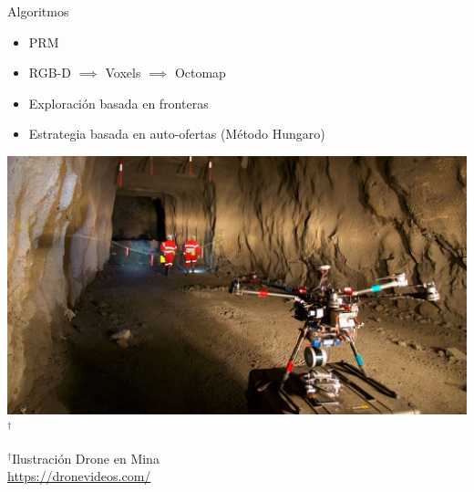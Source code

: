 \documentclass[
  24pt, %
  aspectratio=169, %
]{beamer}
\begin{document}
\begin{frame}{Algoritmos}
  
  \begin{minipage}{0.47\textwidth}
    
    \begin{itemize}
    \item \small PRM 
    \item \small RGB-D $\implies$ Voxels $\implies$ Octomap
      
    \item \small Exploración basada en fronteras
    \item \small Estrategia basada en auto-ofertas (Método Hungaro)
      
    \end{itemize}
  \end{minipage}
  \hspace{0.1cm}
  \begin{minipage}{0.5\textwidth}
    \includegraphics[width=\textwidth]{maxresdefault.jpg}$^\dag$\\
    \rule{0in}{1.2em}$^\dag$\scriptsize Ilustración Drone en Mina \\
    \tiny \url{https://dronevideos.com/} 
  \end{minipage}
  
\end{frame}
\end{document}
